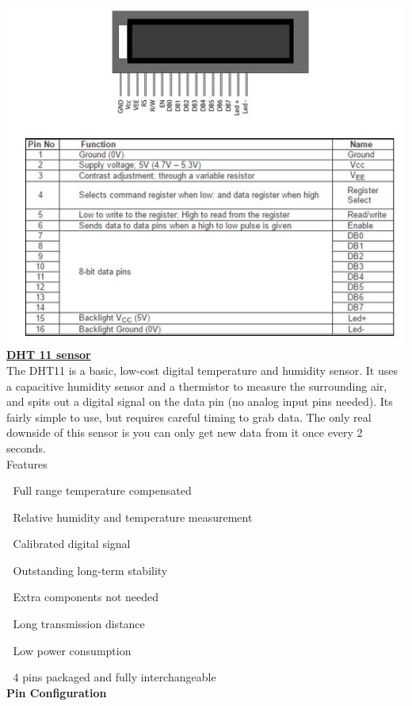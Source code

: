 \documentclass[11pt]{report}
\begin{document}
	 \includegraphics{lcd.jpg}\\
	 
	 
	  \underline{{\LARGE \textbf{DHT 11 sensor}}}\\
	  
	  The DHT11 is a basic, low-cost digital temperature and humidity sensor. It uses a capacitive humidity sensor and a thermistor to measure the surrounding air, and spits out a digital signal on the data pin (no analog input pins needed). Its fairly simple to use, but requires careful timing to grab data. The only real downside of this sensor is you can only get new data from it once every 2 seconds.
	  \\
	  
	  {\Large Features}
	  
	  	Full range temperature compensated
	  
	  	Relative humidity and temperature measurement
	  
	  	Calibrated digital signal
	  
	  	Outstanding long-term stability
	  
	  	Extra components not needed
	  
	  	Long transmission distance
	  
	  	Low power consumption
	  
	  	4 pins packaged and fully interchangeable
	  \\
	  
	  \textbf{Pin Configuration}\\
	  
\end{document}
